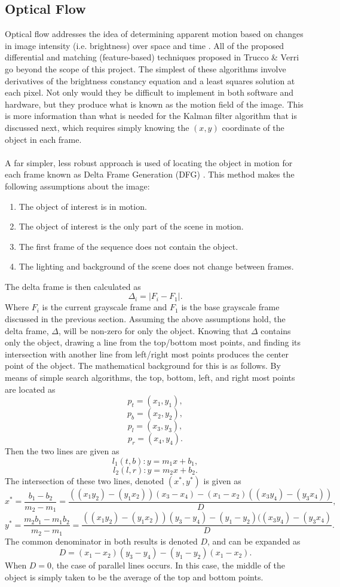 \documentclass[12pt]{article} %
\begin{document}
\subsection{Optical Flow}
\label{sec:of}
Optical flow addresses the idea of determining apparent motion based on changes in image intensity (i.e. brightness) over space and time \cite{4}. All of the proposed differential and matching (feature-based) techniques proposed in Trucco \& Verri \cite{4} go beyond the scope of this project. The simplest of these algorithms involve derivatives of the brightness constancy equation and a least squares solution at each pixel. Not only would they be difficult to implement in both software and hardware, but they produce what is known as the motion field of the image. This is more information than what is needed for the Kalman filter algorithm that is discussed next, which requires simply knowing the $(x,y)$ coordinate of the object in each frame. \\\\
A far simpler, less robust approach is used of locating the object in motion for each frame known as Delta Frame Generation (DFG) \cite{8}. This method makes the following assumptions about the image:
\begin{enumerate}
\item The object of interest is in motion.
\item The object of interest is the only part of the scene in motion.
\item The first frame of the sequence does not contain the object.
\item The lighting and background of the scene does not change between frames.
\end{enumerate}
The delta frame is then calculated as 
\begin{equation}
\Delta_i = | F_i - F_1 |.
\end{equation}
Where $F_i$ is the current grayscale frame and $F_1$ is the base grayscale frame discussed in the previous section. Assuming the above assumptions hold, the delta frame, $\Delta$, will be non-zero for only the object. Knowing that $\Delta$ contains only the object, drawing a line from the top/bottom most points, and finding its intersection with another line from left/right most points produces the center point of the object. The mathematical background for this is as follows. By means of simple search algorithms, the top, bottom, left, and right most points are located as
\[
p_t = (x_1, y_1) ,
\]
\[
p_b = (x_2, y_2) ,
\]
\[
p_l = (x_3, y_3) ,
\]
\[
p_r = (x_4, y_4) .
\]
Then the two lines are given as 
\[
l_1(t,b): y = m_1 x + b_1,
\]
\[
l_2(l,r): y = m_2 x + b_2.
\]
The intersection of these two lines, denoted $(x^*, y^*)$ is given as
\[
x^* = \frac{b_1 - b_2}{m_2 - m_1} = \frac{((x_1y_2) - (y_1x_2))(x_3 - x_4) - (x_1 - x_2)((x_3y_4) - (y_3x_4))}{D},
\]
\[
y^*  = \frac{m_2 b_1 - m_1 b_2}{m_2 - m_1} = \frac{((x_1y_2) - (y_1x_2))(y_3 - y_4) - (y_1 - y_2)((x_3y_4) - (y_3x_4)}{D}.
\]
The common denominator in both results is denoted $D$, and can be expanded as
\[
D = (x_1 - x_2)(y_3 - y_4) - (y_1 - y_2)(x_1 - x_2).
\]
When $D = 0$, the case of parallel lines occurs. In this case, the middle of the object is simply taken to be the average of the top and bottom points.
\end{document}
